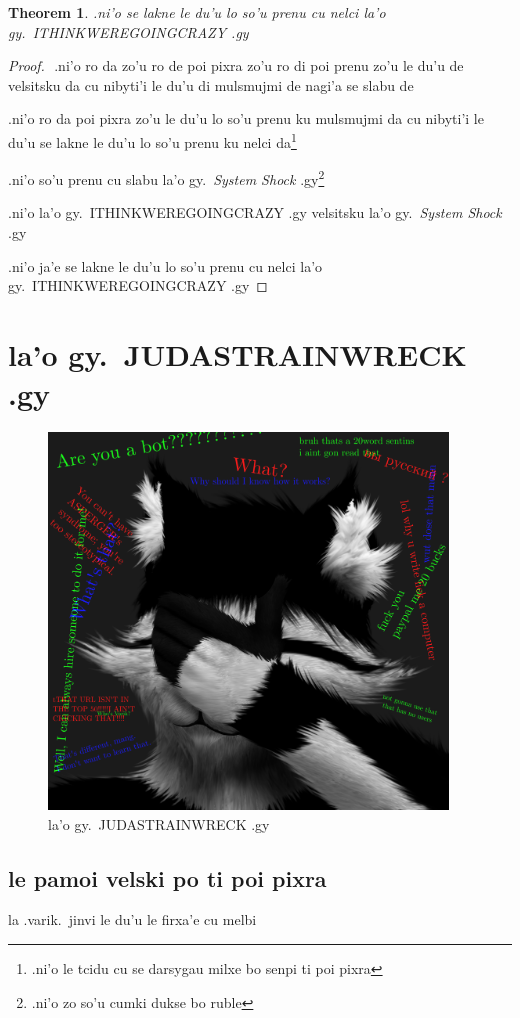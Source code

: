 \documentclass{report}
\newtheorem{thm}{Theorem}
\begin{document}
\begin{thm}
.ni'o se lakne le du'u lo so'u prenu cu nelci la'o gy.\ ITHINKWEREGOINGCRAZY .gy

\end{thm}
\begin{proof}
${}$
.ni'o ro da zo'u ro de poi pixra zo'u ro di poi prenu zo'u le du'u de velsitsku da cu nibyti'i le du'u di mulsmujmi de nagi'a se slabu de

.ni'o ro da poi pixra zo'u le du'u lo so'u prenu ku mulsmujmi da cu nibyti'i le du'u se lakne le du'u lo so'u prenu ku nelci da\footnote{.ni'o le tcidu cu se darsygau milxe bo senpi ti poi pixra}

.ni'o so'u prenu cu slabu la'o gy.\ \textit{System Shock} .gy\footnote{.ni'o zo so'u cumki dukse bo ruble}

.ni'o la'o gy.\ ITHINKWEREGOINGCRAZY .gy velsitsku la'o gy.\ \textit{System Shock} .gy

.ni'o ja'e se lakne le du'u lo so'u prenu cu nelci la'o gy.\ ITHINKWEREGOINGCRAZY .gy

\end{proof}
\chapter{la'o gy.\ JUDASTRAINWRECK .gy}
\begin{figure}[ht]
	\centering
	\includegraphics[height=10cm]{judastrainwreck/judastrainwreck.png}
	\caption[center]{la'o gy.\ JUDASTRAINWRECK .gy}
\end{figure}
\section{le pamoi velski po ti poi pixra}
la .varik.\ jinvi le du'u le firxa'e cu melbi
\end{document}
